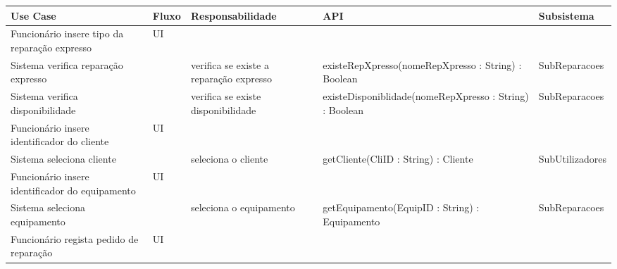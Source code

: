 \documentclass[../relatorio.tex]{subfiles}
\begin{document}
\begin{landscape}
    \begin{table}[!h]
        \centering
        \begin{tabular}{|p{5cm}|p{1cm}|p{4cm}|p{6cm}|p{3cm}|}
            \hline
            \rowcolor{gray!20!white}
            Use Case & Fluxo                                            & Responsabilidade & API & Subsistema \\
            \hline
            \rowcolor{yellow}
            Funcionário insere tipo da reparação expresso
                     & UI
                     & 
                     & 
                     & 
            \\
            \hline
            Sistema verifica reparação expresso
                     & 
                     & verifica se existe a reparação expresso
                     & existeRepXpresso(nomeRepXpresso : String) : Boolean
                     & SubReparacoes
            \\
            \hline
            Sistema verifica disponibilidade
                     & 
                     & verifica se existe disponibilidade
                     & existeDisponiblidade(nomeRepXpresso : String) : Boolean
                     & SubReparacoes
            \\
            \hline
            \rowcolor{yellow}
            Funcionário insere identificador do cliente
                     & UI
                     & 
                     & 
                     & 
            \\
            \hline
            Sistema seleciona cliente
                     & 
                     & seleciona o cliente
                     & getCliente(CliID : String) : Cliente
                     & SubUtilizadores
            \\
            \hline
            \rowcolor{yellow}
            Funcionário insere identificador do equipamento
                     & UI
                     & 
                     & 
                     & 
            \\
            Sistema seleciona equipamento
                     & 
                     & seleciona o equipamento
                     & getEquipamento(EquipID : String) : Equipamento
                     & SubReparacoes
            \\
            \hline
            \rowcolor{yellow}
            Funcionário regista pedido de reparação
                     & UI
                     & 
                     & 
                     & 

\end{tabular}
\end{table}
\end{landscape}
\end{document}
